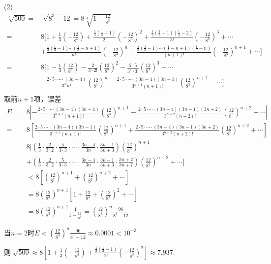 \documentclass[12pt,UTF8]{ctexart}
\newcommand\Ser[1]{\sum_{n=#1}^\infty}
\begin{document}
\begin{enumerate}
(2)\[\begin{split}
\sqrt[3]{500}=&\sqrt[3]{8^3-12}=8\sqrt[3]{1-\frac{12}{8^3}}\\
=&8[1+\frac13(-\frac{12}{8^3})+\frac{\frac13(\frac13-1)}{2!}(-\frac{12}{8^3})^2+\frac{\frac13(\frac13-1)(\frac13-2)}{3!}(-\frac{12}{8^3})^3+\cdots\\
&+\frac{\frac13(\frac13-1)\cdots(\frac13-n+1)}{n!}(-\frac{12}{8^3})^n+\frac{\frac13(\frac13-1)\cdots(\frac13-n+1)(\frac13-n)}{(n+1)!}(-\frac{12}{8^3})^{n+1}+\cdots]\\
=&8[1-\frac13(\frac{12}{8^3})-\frac{2}{3\cdot2!}(\frac{12}{8^3})^2-\frac{2\cdot5}{3^2\cdot3!}(\frac{12}{8^3})^3-\cdots\\
&-\frac{2\cdot5\cdot\cdots\cdot(3n-4)}{3^nn!}(\frac{12}{8^3})^n-\frac{2\cdot5\cdot\cdots\cdot(3n-4)(3n-1)}{3^{n+1}(n+1)!}(\frac{12}{8^3})^{n+1}-\cdots]\\
\end{split}\]
取前$n+1$项，误差
\[\begin{split}
E=&8|-\frac{2\cdot5\cdot\cdots\cdot(3n-4)(3n-1)}{3^{n+1}(n+1)!}(\frac{12}{8^3})^{n+1}-\frac{2\cdot5\cdot\cdots\cdot(3n-4)(3n-1)(3n+2)}{3^{n+2}(n+2)!}(\frac{12}{8^3})^{n+2}-\cdots|\\
=&8[\frac{2\cdot5\cdot\cdots\cdot(3n-4)(3n-1)}{3^{n+1}(n+1)!}(\frac{12}{8^3})^{n+1}+\frac{2\cdot5\cdot\cdots\cdot(3n-4)(3n-1)(3n+2)}{3^{n+2}(n+2)!}(\frac{12}{8^3})^{n+2}+\cdots]\\
=&8[(\frac13\cdot\frac2{3\cdot2}\cdot\frac5{3\cdot3}\cdot\cdots\cdot\frac{3n-4}{3n}\cdot\frac{3n-1}{3n+3})(\frac{12}{8^3})^{n+1}\\
&+(\frac13\cdot\frac2{3\cdot2}\cdot\frac5{3\cdot3}\cdot\cdots\cdot\frac{3n-4}{3n}\cdot\frac{3n-1}{3n+3}\cdot\frac{3n+2}{3n+7})(\frac{12}{8^3})^{n+2}+\cdots]\\
&<8[(\frac{12}{8^3})^{n+1}+(\frac{12}{8^3})^{n+2}+\cdots]\\
&=8(\frac{12}{8^3})^{n+1}[1+\frac{12}{8^3}+(\frac{12}{8^3})^2+\cdots]\\
&=8(\frac{12}{8^3})^{n+1}\frac1{1-\frac{12}{8^3}}=(\frac{12}{8^3})^n\frac{96}{8^3-12}
\end{split}\]

当$n=2$时$E<(\frac{12}{8^3})^n\frac{96}{8^3-12}\approx0.0001<10^{-3}$

则$\sqrt[3]{500}\approx8[1+\frac13(-\frac{12}{8^3})+\frac{\frac13(\frac13-1)}{2!}(-\frac{12}{8^3})^2]\approx7.937$.
%
%


\end{enumerate}
\end{document}
